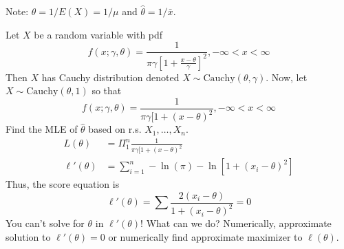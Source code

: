\documentclass{article}
\begin{document}
Note: $\theta = 1/E(X) = 1/\mu$ and $\hat{\theta} = 1/\bar{x}$. 

 Let $X$ be a random variable with pdf 
\[ f(x;\gamma,\theta) = \frac{1}{\pi \gamma[1 + \frac{x-\theta}{\gamma}]^2}, -\infty<x<\infty
\]
Then $X$ has Cauchy distribution denoted $X \sim \text{Cauchy}(\theta,\gamma)$. Now, let $X\sim\text{Cauchy}(\theta,1)$ so that 
\[ f(x;\gamma,\theta) = \frac{1}{\pi \gamma[1 + (x-\theta)^2}, -\infty<x<\infty
\] 
Find the MLE of $\hat{\theta}$ based on r.s. $X_1,\ldots,X_n$.
\begin{align*} 
L(\theta) & = \Pi_{1}^n \frac{1}{\pi \gamma[1 + (x-\theta)^2} \\
\ell'(\theta) & = \sum_{i=1}^n -\ln(\pi)-\ln[1+(x_i-\theta)^2]
\end{align*} 
Thus, the score equation is 
\[
\ell'(\theta) = \sum \frac{2(x_i-\theta)}{1+(x_i-\theta)^2} = 0
\]
You can't solve for $\theta$ in $\ell'(\theta)$! What can we do? Numerically, approximate solution to $\ell'(\theta)=0$ or numerically find approximate maximizer to $\ell(\theta)$.  
\end{document}
